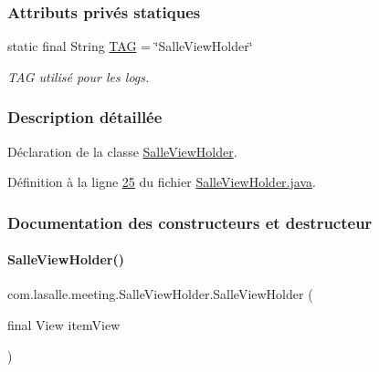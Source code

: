 \subsubsection*{Attributs privés statiques}
\begin{DoxyCompactItemize}
\item 
static final String \hyperlink{classcom_1_1lasalle_1_1meeting_1_1_salle_view_holder_acde5b16df12d2d83074c53bbfe7220b9}{T\+AG} = \char`\"{}Salle\+View\+Holder\char`\"{}
\begin{DoxyCompactList}\small\item\em T\+AG utilisé pour les logs. \end{DoxyCompactList}\end{DoxyCompactItemize}


\subsubsection{Description détaillée}
Déclaration de la classe \hyperlink{classcom_1_1lasalle_1_1meeting_1_1_salle_view_holder}{Salle\+View\+Holder}. 

Définition à la ligne \hyperlink{_salle_view_holder_8java_source_l00025}{25} du fichier \hyperlink{_salle_view_holder_8java_source}{Salle\+View\+Holder.\+java}.



\subsubsection{Documentation des constructeurs et destructeur}
\mbox{\label{classcom_1_1lasalle_1_1meeting_1_1_salle_view_holder_ab123df6edb081221dc36daff6f8c1763}} 
\paragraph{\texorpdfstring{Salle\+View\+Holder()}{SalleViewHolder()}}
{\footnotesize\ttfamily com.\+lasalle.\+meeting.\+Salle\+View\+Holder.\+Salle\+View\+Holder (\begin{DoxyParamCaption}\item[{final View}]{item\+View }\end{DoxyParamCaption})}



